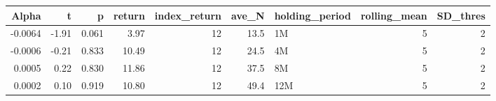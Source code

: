 \begin{table}[ht]
\centering
\begin{tabular}{rrrrrrlrr}
  \hline
Alpha & t & p & return & index\_return & ave\_N & holding\_period & rolling\_mean & SD\_thres \\ 
  \hline
-0.0064 & -1.91 & 0.061 & 3.97 & 12 & 13.5 & 1M &  5 &  2 \\ 
  -0.0006 & -0.21 & 0.833 & 10.49 & 12 & 24.5 & 4M &  5 &  2 \\ 
  0.0005 & 0.22 & 0.830 & 11.86 & 12 & 37.5 & 8M &  5 &  2 \\ 
  0.0002 & 0.10 & 0.919 & 10.80 & 12 & 49.4 & 12M &  5 &  2 \\ 
   \hline
\end{tabular}
\end{table}

